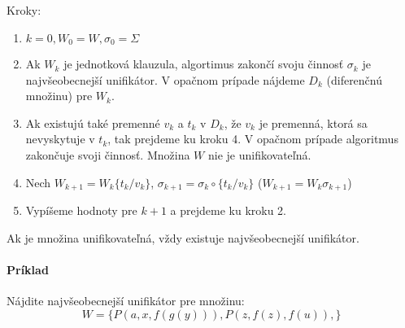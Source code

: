 Kroky:
\begin{enumerate}
	\item $k=0, W_0 = W, \sigma_0 = \Sigma$
	\item Ak $W_k$ je jednotková klauzula, algortimus zakončí svoju činnosť
	$\sigma_k$ je najvšeobecnejší unifikátor. V opačnom prípade nájdeme $D_k$
	(diferenčnú množinu) pre $W_k$.
	\item Ak existujú také premenné $v_k$ a $t_k$ v $D_k$, že $v_k$ je
	premenná, ktorá sa nevyskytuje v $t_k$, tak prejdeme ku kroku 4. V
	opačnom prípade algoritmus zakončuje svoji činnosť. Množina $W$ nie je
	unifikovateľná.
	\item Nech $W_{k+1} = W_k \{t_k/v_k\}$, $\sigma_{k+1} = \sigma_k \circ
	\{t_k/v_k\}$ ($W_{k+1} = W_k \sigma_{k+1}$)

	\item Vypíšeme hodnoty pre $k+1$ a prejdeme ku kroku 2.
\end{enumerate}


Ak je množina unifikovateľná, vždy existuje najvšeobecnejší unifikátor.

\paragraph{Príklad}
Nájdite najvšeobecnejší unifikátor pre množinu: $$W=\{ P(a,x,f(g(y))),
P(z,f(z),f(u)), \}$$

